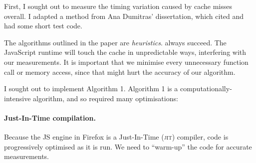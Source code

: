 \documentclass[a4paper,10pt,twocolumn]{article}
\theoremstyle{definition}
\newcommand*{\code}{\texttt}
\newcommand*{\acronym}{\textsc}
\begin{document}

First, I sought out to measure the timing variation caused by cache misses
overall.
I adapted a method from Ana Dumitras' dissertation, which cited
\textcite{Oren_KSK_2015} and had some short test code.

The algorithms outlined in the paper are \emph{heuristics}.%
always succeed.
The JavaScript runtime will touch the cache in unpredictable ways,
interfering with our measurements.
It is important that we minimise every unnecessary function call or memory
access, since that might hurt the accuracy of our algorithm.

I sought out to implement Algorithm 1.
Algorithm 1 is a computationally-intensive algorithm, and so required many
optimisations:


\paragraph{Just-In-Time compilation.}
Because the JS engine in Firefox is a
Just-In-Time (\acronym{jit}) compiler, code is progressively optimised as it is
run.
We need to ``warm-up'' the code for accurate measurements.

\end{document}
